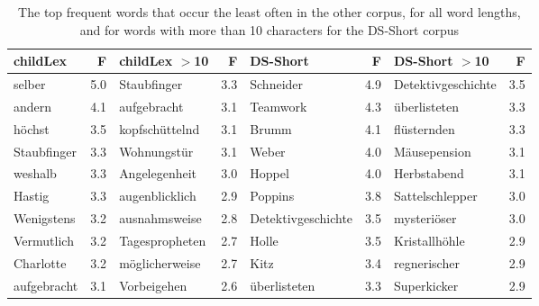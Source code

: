 \documentclass[manuscript]{stjour}
\begin{document}
\begin{table}[!htbp]
\caption{The top frequent words that occur the least often in the other corpus, for all word lengths, and for words with more than 10 characters for the DS-Short corpus}
\centering
\begin{tabular}{lrlrlrlr}
  \hline
childLex & F & childLex $>$10 & F & DS-Short & F & DS-Short $>$10 & F \\ 
  \hline
selber & 5.0 & Staubfinger & 3.3 & Schneider & 4.9 & Detektivgeschichte & 3.5 \\ 
  andern & 4.1 & aufgebracht & 3.1 & Teamwork & 4.3 & überlisteten & 3.3 \\ 
  höchst & 3.5 & kopfschüttelnd & 3.1 & Brumm & 4.1 & flüsternden & 3.3 \\ 
  Staubfinger & 3.3 & Wohnungstür & 3.1 & Weber & 4.0 & Mäusepension & 3.1 \\ 
  weshalb & 3.3 & Angelegenheit & 3.0 & Hoppel & 4.0 & Herbstabend & 3.1 \\ 
  Hastig & 3.3 & augenblicklich & 2.9 & Poppins & 3.8 & Sattelschlepper & 3.0 \\ 
  Wenigstens & 3.2 & ausnahmsweise & 2.8 & Detektivgeschichte & 3.5 & mysteriöser & 3.0 \\ 
  Vermutlich & 3.2 & Tagespropheten & 2.7 & Holle & 3.5 & Kristallhöhle & 2.9 \\ 
  Charlotte & 3.2 & möglicherweise & 2.7 & Kitz & 3.4 & regnerischer & 2.9 \\ 
  aufgebracht & 3.1 & Vorbeigehen & 2.6 & überlisteten & 3.3 & Superkicker & 2.9 \\ 
   \hline
\end{tabular}
\label{words-dssh-low}
\end{table}
\end{document}
